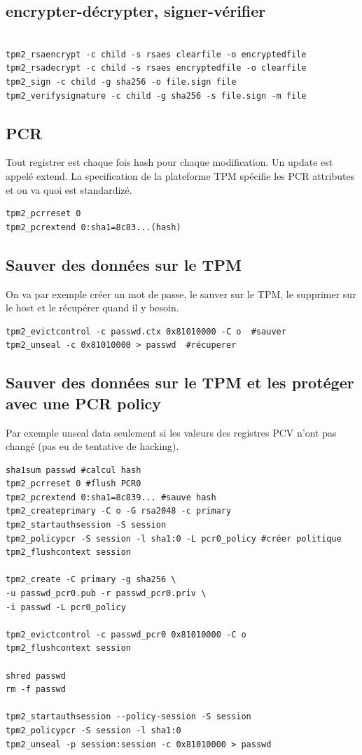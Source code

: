 \subsection{encrypter-décrypter, signer-vérifier}
\begin{lstlisting}[style=bash]

tpm2_rsaencrypt -c child -s rsaes clearfile -o encryptedfile
tpm2_rsadecrypt -c child -s rsaes encryptedfile -o clearfile
tpm2_sign -c child -g sha256 -o file.sign file
tpm2_verifysignature -c child -g sha256 -s file.sign -m file
\end{lstlisting}

\subsection{PCR}
Tout registrer est chaque fois hash pour chaque modification. Un update est appelé extend. La specification de la plateforme TPM spécifie les PCR attributes et ou va quoi est standardizé.
\begin{lstlisting}[style=bash]
tpm2_pcrreset 0
tpm2_pcrextend 0:sha1=8c83...(hash)
\end{lstlisting}

\subsection{Sauver des données sur le TPM}
On va par exemple créer un mot de passe, le sauver sur le TPM, le supprimer sur le host et le récupérer quand il y besoin.
\begin{lstlisting}[style=bash]
tpm2_evictcontrol -c passwd.ctx 0x81010000 -C o  #sauver
tpm2_unseal -c 0x81010000 > passwd  #récuperer
\end{lstlisting}

\subsection{Sauver des données sur le TPM et les protéger avec une PCR policy}
Par exemple unseal data seulement si les valeurs des registres PCV n'ont pas changé (pas eu de tentative de hacking).
\begin{lstlisting}[style=bash]
sha1sum passwd #calcul hash
tpm2_pcrreset 0 #flush PCR0
tpm2_pcrextend 0:sha1=8c839... #sauve hash
tpm2_createprimary -C o -G rsa2048 -c primary
tpm2_startauthsession -S session
tpm2_policypcr -S session -l sha1:0 -L pcr0_policy #créer politique
tpm2_flushcontext session

tpm2_create -C primary -g sha256 \
-u passwd_pcr0.pub -r passwd_pcr0.priv \
-i passwd -L pcr0_policy

tpm2_evictcontrol -c passwd_pcr0 0x81010000 -C o
tpm2_flushcontext session

shred passwd
rm -f passwd

tpm2_startauthsession --policy-session -S session
tpm2_policypcr -S session -l sha1:0
tpm2_unseal -p session:session -c 0x81010000 > passwd
\end{lstlisting}


